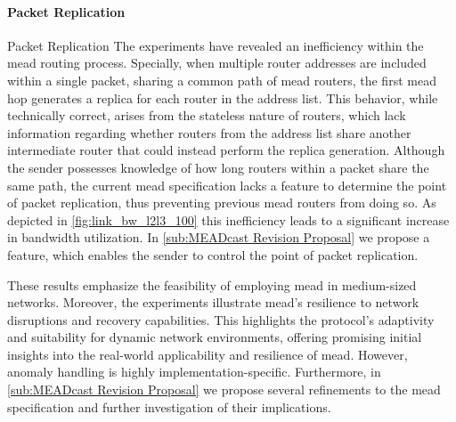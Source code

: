 \begin{itemize}
    \paragraph{Packet Replication} %
    \label{par:Discussion Packet Replication}
Packet Replication    The experiments have revealed an inefficiency within the \gls{mead} routing
        process.
    Specially, when multiple router addresses are included within a single
        packet, sharing a common path of \gls{mead} routers, the first \gls{mead}
        hop generates a replica for each router in the address list.
    This behavior, while technically correct, arises from the stateless nature
        of routers, which lack information regarding whether routers from the
        address list share another intermediate router that could instead
        perform the replica generation.
    Although the sender possesses knowledge of how long routers within a packet
        share the same path, the current \gls{mead} specification lacks a feature
        to determine the point of packet replication, thus preventing previous
        \gls{mead} routers from doing so.
    As depicted in \autoref{fig:link_bw_l2l3_100} this inefficiency leads to a
        significant increase in bandwidth utilization.
    In \autoref{sub:MEADcast Revision Proposal} we propose a feature, which
        enables the sender to control the point of packet replication.

    These results emphasize the feasibility of employing \gls{mead} in
        medium-sized networks.
    Moreover, the experiments illustrate \gls{mead}'s resilience to network
        disruptions and recovery capabilities.
    This highlights the protocol's adaptivity and suitability for dynamic
        network environments, offering promising initial insights into the
        real-world applicability and resilience of \gls{mead}.
    However, anomaly handling is highly implementation-specific.
    Furthermore, in \autoref{sub:MEADcast Revision Proposal} we propose several
        refinements to the \gls{mead} specification and further investigation of
        their implications.
\end{itemize}

